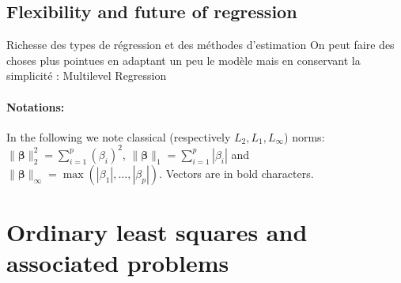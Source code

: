 \documentclass[12pt,a4paper]{report}
\begin{document}
			
		\subsection{Flexibility and future of regression}
			Richesse des types de régression et des méthodes d'estimation
			On peut faire des choses plus pointues en adaptant un peu le modèle mais en conservant la simplicité : Multilevel Regression \cite{moerbeek2003comparison,maas2004robustness,hox1998multilevel}




\paragraph{Notations:}	
In the following we note classical (respectively $L_2,L_1,L_{\infty}$) norms: $\parallel\boldsymbol{\beta}\parallel_2^2=\sum_{i=1}^p(\beta_i)^2$, $\parallel\boldsymbol{\beta} \parallel_1=\sum_{i=1}^p|\beta_i| $ and $\parallel\boldsymbol{\beta} \parallel_{\infty}=\operatorname{max}(|\beta_1|,\dots,|\beta_p|)$. Vectors are in bold characters.
	\section{Ordinary least squares and associated problems}\label{sectionOLS}		%
\end{document}
